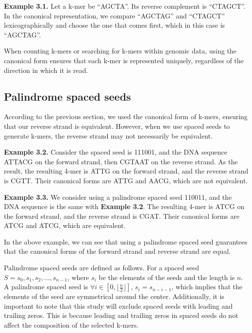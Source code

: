 \documentclass[PhD]{PHlab-thesis}
\begin{document}
\textbf{Example 3.1.} Let a k-mer be ``AGCTA''. Its reverse complement is ``CTAGCT''. In the canonical representation, we compare ``AGCTAG'' and ``CTAGCT'' lexicographically and choose the one that comes first, which in this case is ``AGCTAG''.
\vspace{1em}

When counting k-mers or searching for k-mers within genomic data, using the canonical form ensures that each k-mer is represented uniquely, regardless of the direction in which it is read.

\subsection{Palindrome spaced seeds}
According to the previous section, we used the canonical form of k-mers, ensuring that our reverse strand is equivalent. However, when we use spaced seeds to generate k-mers, the reverse strand may not necessarily be equivalent.
\vspace{2em}

\textbf{Example 3.2.} Consider the spaced seed is 111001, and the DNA sequence ATTACG on the forward strand, then CGTAAT on the reverse strand. As the result, the resulting 4-mer is ATTG on the forward strand, and the reverse strand is CGTT. Their canonical forms are ATTG and AACG, which are not equivalent.
\vspace{1em}

\textbf{Example 3.3.} We consider using a palindrome spaced seed 110011, and the DNA sequence is the same with \textbf{Example 3.2}. The resulting 4-mer is ATCG on the forward strand, and the reverse strand is CGAT. Their canonical forms are ATCG and ATCG, which are equivalent.
\vspace{1em}

In the above example, we can see that using a palindrome spaced seed guarantees that the canonical forms of the forward strand and reverse strand are equal.

Palindrome spaced seeds are defined as follows. For a spaced seed $S=s_0,s_1,s_2,...,s_{n-1}$, where $s_i$ be the elements of the seeds and the length is $n$. A palindrome spaced seed is $\forall i \in [0, \lfloor \frac{n}{2} \rfloor]$, $s_i = s_{n-i-1}$, which implies that the elements of the seed are symmetrical around the center. Additionally, it is important to note that this study will exclude spaced seeds with leading and trailing zeros. This is because leading and trailing zeros in spaced seeds do not affect the composition of the selected k-mers.  
\end{document}

